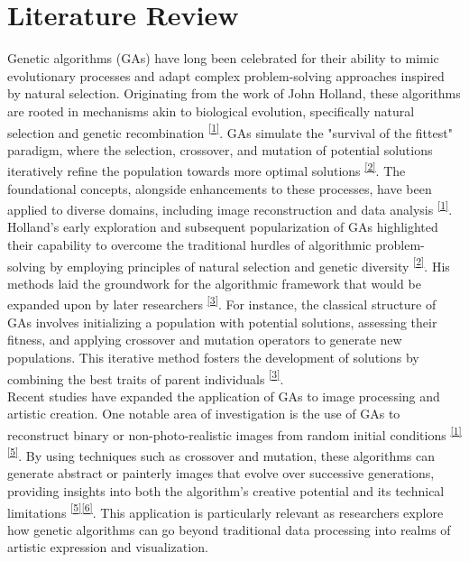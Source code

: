 \documentclass[10pt, conference]{IEEEtran}
\begin{document}
\section{Literature Review}
Genetic algorithms (GAs) have long been celebrated for their ability to mimic evolutionary processes and adapt complex problem-solving approaches inspired by natural selection. Originating from the work of John Holland, these algorithms are rooted in mechanisms akin to biological evolution, specifically natural selection and genetic recombination \hypertarget{ref}{\textsuperscript{\hyperref[sec:1r]{[1]}\label{sec:1}}}. GAs simulate the "survival of the fittest" paradigm, where the selection, crossover, and mutation of potential solutions iteratively refine the population towards more optimal solutions \hypertarget{ref}{\textsuperscript{\hyperref[sec:2r]{[2]}\label{sec:2}}}. The foundational concepts, alongside enhancements to these processes, have been applied to diverse domains, including image reconstruction and data analysis \hypertarget{ref}{\textsuperscript{\hyperref[sec:1r]{[1]}\label{sec:1}}}. \\

Holland's early exploration and subsequent popularization of GAs highlighted their capability to overcome the traditional hurdles of algorithmic problem-solving by employing principles of natural selection and genetic diversity \hypertarget{ref}{\textsuperscript{\hyperref[sec:2r]{[2]}\label{sec:2}}}. His methods laid the groundwork for the algorithmic framework that would be expanded upon by later researchers \hypertarget{ref}{\textsuperscript{\hyperref[sec:3r]{[3]}\label{sec:3}}}. For instance, the classical structure of GAs involves initializing a population with potential solutions, assessing their fitness, and applying crossover and mutation operators to generate new populations. This iterative method fosters the development of solutions by combining the best traits of parent individuals \hypertarget{ref}{\textsuperscript{\hyperref[sec:3r]{[3]}\label{sec:3}}}. \\

Recent studies have expanded the application of GAs to image processing and artistic creation. One notable area of investigation is the use of GAs to reconstruct binary or non-photo-realistic images from random initial conditions \hypertarget{ref}{\textsuperscript{\hyperref[sec:1r]{[1]}\label{sec:1}}}\hypertarget{ref}{\textsuperscript{\hyperref[sec:5r]{[5]}\label{sec:5}}}. By using techniques such as crossover and mutation, these algorithms can generate abstract or painterly images that evolve over successive generations, providing insights into both the algorithm's creative potential and its technical limitations \hypertarget{ref}{\textsuperscript{\hyperref[sec:5r]{[5]}\label{sec:5}}}\hypertarget{ref}{\textsuperscript{\hyperref[sec:6r]{[6]}\label{sec:6}}}. This application is particularly relevant as researchers explore how genetic algorithms can go beyond traditional data processing into realms of artistic expression and visualization.\\
\end{document}
